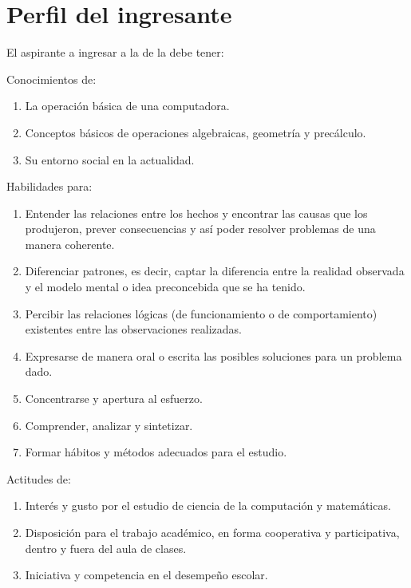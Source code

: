 \section{Perfil del ingresante}

El aspirante a ingresar a la \SchoolFullName de la \University debe tener:

\noindent Conocimientos de:
\begin{enumerate}
\item La operación básica de una computadora.
\item Conceptos básicos de operaciones algebraicas, geometrí­a y precálculo.
\item Su entorno social en la actualidad.
\end{enumerate}

\noindent Habilidades para:
\begin{enumerate}
\item Entender las relaciones entre los hechos y encontrar las causas que los produjeron, prever consecuencias y así­ poder resolver problemas de una manera coherente.
\item Diferenciar patrones, es decir, captar la diferencia entre la realidad observada y el modelo mental o idea preconcebida que se ha tenido.
\item Percibir las relaciones lógicas (de funcionamiento o de comportamiento) existentes entre las observaciones realizadas.
\item Expresarse de manera oral o escrita las posibles soluciones para un problema dado.
\item Concentrarse y apertura al esfuerzo.
\item Comprender, analizar y sintetizar.
\item Formar hábitos y métodos adecuados para el estudio.
\end{enumerate}

\noindent Actitudes de:
\begin{enumerate}
\item Interés y gusto por el estudio de ciencia de la computación y matemáticas.
\item Disposición para el trabajo académico, en forma cooperativa y participativa, dentro y fuera del aula de clases.
\item Iniciativa y competencia en el desempeño escolar.
\end{enumerate}
